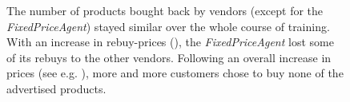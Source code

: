 \begin{figure}[ht]
\begin{subfigure}[t]{0.49\textwidth}
		\label{fig:PPOOligopolyLineBuyNothing}
	\end{subfigure}
	\caption{The number of products bought back by vendors (except for the \emph{FixedPriceAgent}) stayed similar over the whole course of training. With an increase in rebuy-prices (), the \emph{FixedPriceAgent} lost some of its rebuys to the other vendors. Following an overall increase in prices (see e.g. ), more and more customers chose to buy none of the advertised products.}\label{fig:PPOOligopolyDiagramsOwners}
\end{figure}